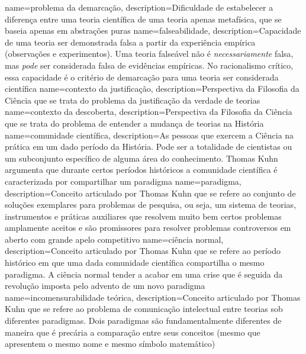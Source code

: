 {
    name=problema da demarcação,
    description={Dificuldade de estabelecer a diferença entre uma teoria científica de uma teoria apenas metafísica, que se baseia apenas em abstrações puras}
}
{
    name=falseabilidade,
    description={Capacidade de uma teoria ser demonstrada falsa a partir da experiência empírica (observações e experimentos). Uma teoria falseável não é \textit{necessariamente} falsa, mas \textit{pode} ser considerada falsa de evidências empíricas. No racionalismo crítico, essa capacidade é o critério de demarcação para uma teoria ser considerada científica}
}
{
    name=contexto da justificação,
    description={Perspectiva da Filosofia da Ciência que se trata do problema da justificação da verdade de teorias}
}
{
    name=contexto da descoberta,
    description={Perspectiva da Filosofia da Ciência que se trata do problema de entender a mudança de teorias na História}
}
{
    name=comunidade científica,
    description={As pessoas que exercem a Ciência na prática em um dado período da História. Pode ser a totalidade de cientistas ou um subconjunto específico de alguma área do conhecimento. Thomas Kuhn argumenta que durante certos períodos históricos a comunidade científica é caracterizada por compartilhar um paradigma}
}
{
    name=paradigma,
    description={Conceito articulado por Thomas Kuhn que se refere ao conjunto de soluções exemplares para problemas de pesquisa, ou seja, um sistema de teorias, instrumentos e práticas auxiliares que resolvem muito bem certos problemas amplamente aceitos e são promissores para resolver problemas controversos em aberto com grande apelo competitivo}
}
{
    name=ciência normal,
    description={Conceito articulado por Thomas Kuhn que se refere ao período histórico em que uma dada comunidade científica compartilha o mesmo paradigma. A ciência normal tender a acabar em uma crise que é seguida da revolução imposta pelo advento de um novo paradigma}
}
{
    name=incomensurabilidade teórica,
    description={Conceito articulado por Thomas Kuhn que se refere ao problema de comunicação intelectual entre teorias sob diferentes paradigmas. Dois paradigmas são fundamentalmente diferentes de maneira que é precária a comparação entre seus conceitos (mesmo que apresentem o mesmo nome e mesmo símbolo matemático)}
}
